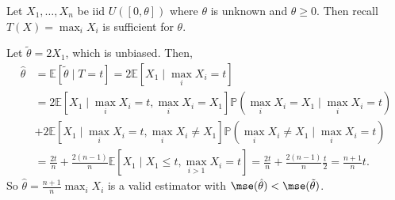 \documentclass[12pt]{article}
\begin{document}
\begin{exbox}
	Let $X_1, \ldots, X_n$ be iid $U([0, \theta])$ where $\theta$ is unknown and $\theta \geq 0$. Then recall $T(X) = \max_{i} X_i$ is sufficient for $\theta$.

	Let $\tilde \theta = 2 X_1$, which is unbiased. Then,
	\begin{align*}
		\hat \theta &= \mathbb{E}[\tilde \theta \mid T = t] = 2 \mathbb{E}[X_1 \mid \max_{i} X_i = t] \\
			    &= 2 \mathbb{E}[X_1 \mid \max_{i} X_i = t, \max_{i} X_i = X_1] \mathbb{P}(\max_{i} X_i = X_1 \mid \max_{i} X_i = t) \\
			    &+ 2 \mathbb{E}[X_1 \mid \max_{i}X_i = t, \max_{i} X_i \neq X_1] \mathbb{P}(\max_{i}X_i \neq X_1 \mid \max_{i}X_i = t) \\
			    &= \frac{2t}{n} + \frac{2(n-1)}{n} \mathbb{E}[X_1 \mid X_1 \leq t, \max_{i>1} X_i = t] = \frac{2t}{n} + \frac{2(n-1)}{n} \frac{t}{2} = \frac{n+1}{n} t.
	\end{align*}
	So $\hat \theta = \frac{n+1}{n} \max_{i} X_i$ is a valid estimator with $\mse(\hat \theta) < \mse(\tilde \theta)$.
\end{exbox}


\newpage

\printindex
\end{document}
